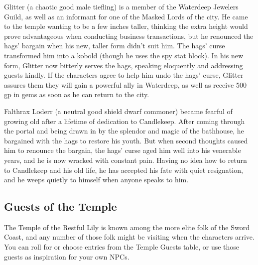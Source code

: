 \documentclass[10pt,a4paper,twoside,bg=print,twocolumn,openany,nodeprecatedcode]{dndbook}
\begin{document}
Glitter (a chaotic good male tiefling) is a member of the Waterdeep Jewelers Guild, as well as an informant for one of the Masked Lords of the city. He came to the temple wanting to be a few inches taller, thinking the extra height would prove advantageous when conducting business transactions, but he renounced the hags' bargain when his new, taller form didn't suit him. The hags' curse transformed him into a kobold (though he uses the spy stat block). In his new form, Glitter now bitterly serves the hags, speaking eloquently and addressing guests kindly. If the characters agree to help him undo the hags' curse, Glitter assures them they will gain a powerful ally in Waterdeep, as well as receive 500 gp in gems as soon as he can return to the city.

Falthrax Loderr (a neutral good shield dwarf commoner) became fearful of growing old after a lifetime of dedication to Candlekeep. After coming through the portal and being drawn in by the splendor and magic of the bathhouse, he bargained with the hags to restore his youth. But when second thoughts caused him to renounce the bargain, the hags' curse aged him well into his venerable years, and he is now wracked with constant pain. Having no idea how to return to Candlekeep and his old life, he has accepted his fate with quiet resignation, and he weeps quietly to himself when anyone speaks to him.

\subsection{Guests of the Temple}
The Temple of the Restful Lily is known among the more elite folk of the Sword Coast, and any number of those folk might be visiting when the characters arrive. You can roll for or choose entries from the Temple Guests table, or use those guests as inspiration for your own NPCs.
\end{document}
